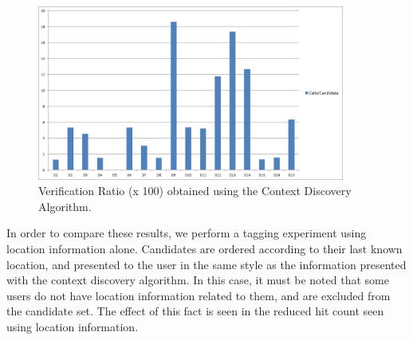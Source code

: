 \begin{figure}[t]
\centering
\includegraphics[width=0.9\textwidth]{media/chapter5/cx-verification-ratio-all-datasets.png}
\caption{Verification Ratio (x 100) obtained using the Context Discovery Algorithm.}
\label{fig:exp-cx-verification-ratio}
\end{figure}

In order to compare these results, we perform a tagging experiment using location information alone. Candidates are ordered according to their last known location, and presented to the user in the same style as the information presented with the context discovery algorithm. In this case, it must be noted that some users do not have location information related to them, and are excluded from the candidate set. The effect of this fact is seen in the reduced hit count seen using location information.


